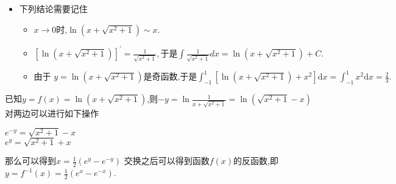 \documentclass[12pt, a4paper, oneside, UTF8]{ctexbook}  %
\begin{document}
\begin{sloppypar}
\begin{note}
\begin{itemize}
            \item 下列结论需要记住
                  \begin{itemize}
                      \item $x\to0\text{时,}\ln\left(x+\sqrt{x^{2}+1}\right)\sim x.$
                      \item $\left[\ln\left(x+\sqrt{x^{2}+1}\right)\right]^{\prime}=\frac{1}{\sqrt{x^{2}+1}},\text{于是}\int\frac{1}{\sqrt{x^{2}+1}}dx=\ln\left(x+\sqrt{x^{2}+1}\right)+C.$
                      \item $\text{由于 }y=\ln\left(x+\sqrt{x^2+1}\right)\text{是奇函数,于是}\int_{-1}^1\left[\ln\left(x+\sqrt{x^2+1}\right)+x^2\right]\mathrm{d}x=\int_{-1}^1x^2\mathrm{d}x=\frac 23.$
                  \end{itemize}
        \end{itemize}
    \end{note}
    \begin{solution}
        已知$y=f(x)=\ln(x+\sqrt{x^2+1})$,则$-y=\ln \frac{1}{x+\sqrt{x^2+1}}=\ln(\sqrt{x^2+1}-x)$\\
        对两边可以进行如下操作
        \begin{center}
            $e^{-y}=\sqrt{x^2+1}-x$\\
            $e^{y}=\sqrt{x^2+1}+x$\\
        \end{center}
        那么可以得到$x=\frac{1}{2}(e^y-e^{-y})$
        交换之后可以得到函数$f(x)$的反函数,即
        $y=f^{-1}(x)=\frac{1}{2}(e^x-e^{-x})$.
    \end{solution}

\end{sloppypar}
\end{document}
